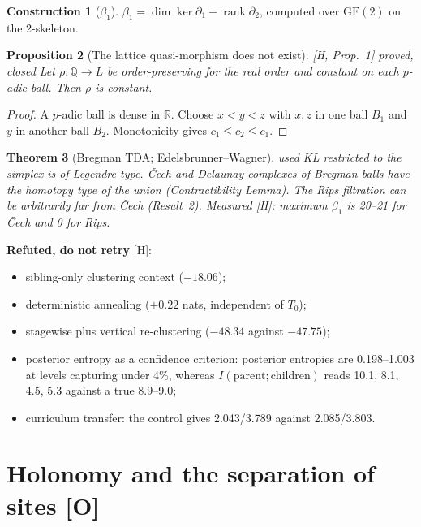 \documentclass[11pt]{article}
\newtheorem{theorem}{Theorem}[section]
\newtheorem{proposition}[theorem]{Proposition}
\theoremstyle{definition}
\newtheorem{construction}[theorem]{Construction}
\theoremstyle{remark}
\newcommand{\Q}{\mathbb{Q}}
\newcommand{\R}{\mathbb{R}}
\newcommand{\src}[1]{\textsf{\small[#1]}}
\newcommand{\st}[1]{\textsf{\small\color{gray}#1}}
\begin{document}
\begin{construction}[$\beta_1$] $\beta_1=\dim\ker\partial_1-\operatorname{rank}\partial_2$, computed over $\mathrm{GF}(2)$ on the 2-skeleton.\end{construction}
\begin{proposition}[The lattice quasi-morphism does not exist]\label{prop:padic}
\src{H, Prop.~1} \st{proved, closed}
Let $\rho:\Q\to L$ be order-preserving for the real order and constant on each $p$-adic ball. Then $\rho$ is constant.
\end{proposition}
\begin{proof}
A $p$-adic ball is dense in $\R$. Choose $x<y<z$ with $x,z$ in one ball $B_1$ and $y$ in another ball $B_2$. Monotonicity gives $c_1\le c_2\le c_1$.
\end{proof}
\begin{theorem}[Bregman TDA; Edelsbrunner--Wagner]\label{thm:ew}\st{used} \cite{ew}
KL restricted to the simplex is of Legendre type. \v{C}ech and Delaunay complexes of Bregman balls have the homotopy type of the union (Contractibility Lemma). The Rips filtration can be arbitrarily far from \v{C}ech (Result~2). Measured \src{H}: maximum $\beta_1$ is 20--21 for \v{C}ech and 0 for Rips.
\end{theorem}

\noindent\textbf{Refuted, do not retry} \src{H}:
\begin{itemize}
  \item sibling-only clustering context ($-18.06$);
  \item deterministic annealing ($+0.22$ nats, independent of $T_0$);
  \item stagewise plus vertical re-clustering ($-48.34$ against $-47.75$);
  \item posterior entropy as a confidence criterion: posterior entropies are 0.198--1.003 at levels capturing under 4\%, whereas $I(\text{parent};\text{children})$ reads 10.1, 8.1, 4.5, 5.3 against a true 8.9--9.0;
  \item curriculum transfer: the control gives 2.043/3.789 against 2.085/3.803.
\end{itemize}

\part{Holonomy and the separation of sites \src{O}}
\end{document}

